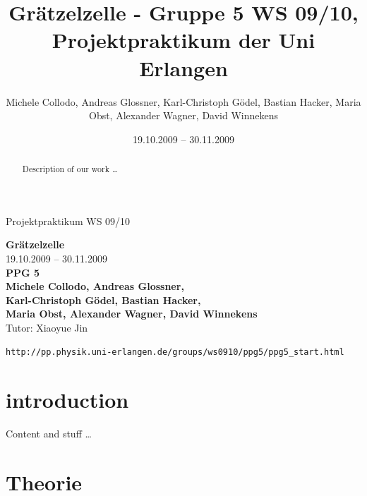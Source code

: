 \documentclass[11pt]{scrartcl}
\title{Gr\"atzelzelle - Gruppe 5 WS 09/10, Projektpraktikum der Uni Erlangen}
\date{19.10.2009 -- 30.11.2009}
\author{Michele Collodo, Andreas Glossner, Karl-Christoph Gödel, Bastian Hacker, Maria Obst, Alexander Wagner, David Winnekens}
\begin{document}
\sloppy %
\thispagestyle{empty}
\large{Projektpraktikum WS 09/10}
\hfill
{}
\\[8\baselineskip]
\begin{center}
\Huge{\textbf{Gr\"atzelzelle}}\\[0.5\baselineskip]
\Large{19.10.2009 -- 30.11.2009}
\\[6\baselineskip]
\Huge{\textbf{PPG 5}}\\[0.5\baselineskip]
\large{\textbf{Michele Collodo, Andreas Glossner,\\
Karl-Christoph Gödel, Bastian Hacker,\\
Maria Obst, Alexander Wagner, David Winnekens}\\
Tutor: Xiaoyue Jin}
\vfill



\small{\texttt{http://pp.physik.uni-erlangen.de/groups/ws0910/ppg5/ppg5\_start.html}}
\end{center}
\newpage



\tableofcontents
\vfill



\begin{abstract}

Description of our work \ldots
\end{abstract}
\newpage



\section{introduction}
Content and stuff \ldots
\section{Theorie}
\end{document}
